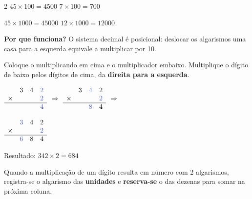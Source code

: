 \documentclass[12pt,twoside]{article}
\begin{document}
\begin{multicols}{2}
$45 \times 100 = 4500$ \quad $7 \times 100 = 700$
\vspace{4pt}

$45 \times 1000 = 45000$ \quad $12 \times 1000 = 12000$

\vspace{4pt}
\textbf{Por que funciona?} O sistema decimal é posicional: deslocar os algarismos uma casa para a esquerda equivale a multiplicar por 10.


Coloque o multiplicando em cima e o multiplicador embaixo. Multiplique o dígito de baixo pelos dígitos de cima, da \textbf{direita para a esquerda}.


\vspace{0.3cm}

$\begin{array}{rrrr}
&3&4&\textcolor{iris}{2}\\
\times &&&\textcolor{iris}{2}\\
\hline&&&\textcolor{iris}{4}\\
\end{array}$
$\Rightarrow$
$\begin{array}{rrrr}
&3&\textcolor{iris}{4}&2\\
\times &&&\textcolor{iris}{2}\\
\hline&&\textcolor{iris}{8}&4\\
\end{array}$
$\Rightarrow$

\vspace{0.2cm}
$\begin{array}{rrrr}
&\textcolor{iris}{3}&4&2\\
\times &&&\textcolor{iris}{2}\\
\hline&\textcolor{iris}{6}&8&4\\
\end{array}$

\vspace{4pt}
Resultado: $342 \times 2 = 684$


Quando a multiplicação de um dígito resulta em número com 2 algarismos, registra-se o algarismo das \textbf{unidades} e \textbf{reserva-se} o das dezenas para somar na próxima coluna.


\vspace{0.3cm}


\end{multicols}
\end{document}
